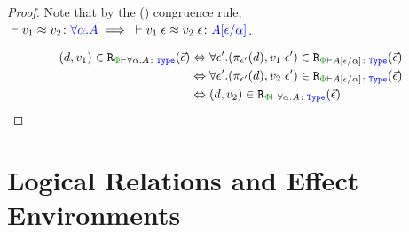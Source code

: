 \begin{framed}
\begin{proof}
    \case{\tquant}
    Note that by the (\textit{\eqspec}) congruence rule, $\zberelation{v_1}{v_2}{\all{\a}{A}} \implies \zberelation{\eapp{v_1}{\e}}{\eapp{v_2}{\e}}{A\ssub{\a}{\e}}$.
    
    \begin{align*}
        \inLogRelPE{d}{v_1}{\all{\a}{A}} & \Leftrightarrow \forall \e'. \inLogRelPE{\pi_{\e'}(d)}{\eapp{v_1}{\e'}}{A\ssub{\a}{\e}}
        \\ & \Leftrightarrow \forall \e'. \inLogRelPE{\pi_{\e'}(d)}{\eapp{v_2}{\e'}}{A\ssub{\a}{\e}}
        \\ & \Leftrightarrow\inLogRelPE{d}{v_2}{\all{\a}{A}}
    \end{align*}
    \end{proof}
\end{framed}




\section{Logical Relations and Effect Environments}
\label{AdequacyEnvironmentsProof}

